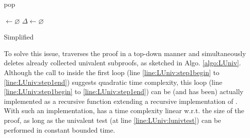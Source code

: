 \documentclass{llncs}
\begin{document}


\begin{algorithm}[bt]
  \BlankLine

   {pop}

  \Univ $\leftarrow \varnothing$ \;
  $\Delta \leftarrow \varnothing$ \;
  \BlankLine

  \BlankLine


  \caption{Simplified \LowerUnivalents}
  \label{algo:LUniv}
\end{algorithm}

To solve this issue, {\LowerUnivalents} traverses the proof in a top-down manner and
simultaneously deletes already collected univalent subproofs, as sketched in Algo. \ref{algo:LUniv}.
Although the call to  inside the first loop (line \ref{line:LUniv:step1begin} to
\ref{line:LUniv:step1end}) suggests quadratic time complexity, this loop (line
\ref{line:LUniv:step1begin} to \ref{line:LUniv:step1end}) can be (and has been) actually implemented
as a recursive function extending a recursive implementation of . With such an
implementation, {\LowerUnivalents} has a time complexity linear w.r.t. the size of the proof, as
long as the univalent test (at line \ref{line:LUniv:lunivtest}) can be performed in constant bounded
time.
\end{document}
